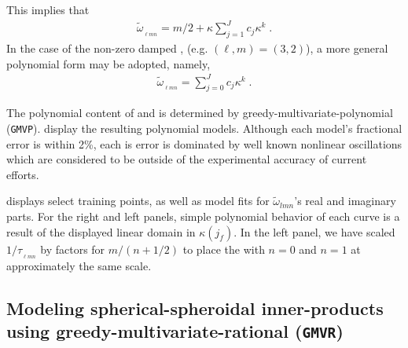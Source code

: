 \documentclass[twocolumn,aps,prd,floatfix,preprintnumbers,a4paper,nofootinbib,
superscriptaddress,10pt]{revtex4-1}
\newcommand{\cw}{\tilde{\omega}}
\def\jf{j_f}
\def\lmn{_{\ell m n}}
\def\gmvp#1{greedy-multivariate-polynomial#1
  (\texttt{GMVP}#1)\gdef\gmvp{\texttt{GMVP}}}
\def\gmvr#1{greedy-multivariate-rational#1
  (\texttt{GMVR}#1)\gdef\gmvr{\texttt{GMVR}}}
\begin{document}
%
This implies that
%
\begin{align}
  \label{eq:zd}
  \cw_{\lmn} = m/2 + \kappa \sum_{j=1}^{J} c_j \kappa^k \; .
\end{align}
%
In the case of the non-zero damped , (e.g. $(\ell,m)=(3,2)$), a more general polynomial form may be adopted, namely,
%
\begin{align}
  \label{eq:nzd}
  \cw_{\lmn} = \sum_{j=0}^{J} c_j \kappa^k \; .
\end{align}
%
\par The polynomial content of  and  is determined by \gmvp{}.
%
 display the resulting polynomial models.
%
Although each model's fractional error is within 2\%, each is error is dominated by well known nonlinear oscillations which are considered to be outside of the experimental accuracy of current \gw{} efforts.
%
\par {} displays select training points, as well as model fits for $\cw_{lmn}$'s real and imaginary parts.
%
For the right and left panels, simple polynomial behavior of each curve is a result of the displayed linear domain in $\kappa(\jf)$.
%
In the left panel, we have scaled $1/\tau_{\lmn}$ by factors for $m/(n+1/2)$ to place the  with $n=0$ and $n=1$ at approximately the same scale.
%
\begin{widetext}
	
\end{widetext}
%
%
\subsection{Modeling spherical-spheroidal inner-products using \gmvr{}}
%
%
\begin{widetext}
  
\end{widetext}
\end{document}
